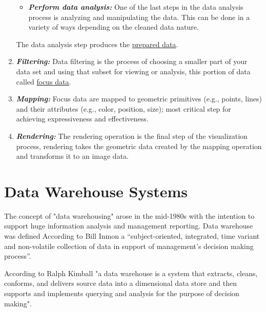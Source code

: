 \begin{enumerate}
\begin{itemize}
  \item \textbf{\textit{Perform data analysis:}}  One of the last steps in the data analysis process is analyzing and manipulating the data. This can be done in a variety of ways depending on the cleaned data nature\cite{WhatDataAnalysis}.
  \end{itemize}
  The data analysis step produces the \underline{prepared data}.
  \item \textbf{\textit{Filtering:}} Data filtering is the process of choosing a smaller part of your data set and using that subset for viewing or analysis\cite{WhatDataFiltering}, this portion of data called \underline{focus data}. 
  \item \textbf{\textit{Mapping:}} Focus data are mapped to geometric primitives (e.g., points, lines) and their attributes (e.g., color, position, size); most critical step for achieving expressiveness and effectiveness.
  \item \textbf{\textit{Rendering:}} The rendering operation is the final step of the visualization process, rendering takes the geometric data created by the mapping operation and transforms it to an image data.
  \end{enumerate}
  



\section{Data Warehouse Systems}
\label{sec:dataWarehouse}
The concept of "data warehousing" arose in the mid-1980s with the intention to support huge information analysis and management reporting\cite{wahDevelopmentDataWarehouse2009}. Data warehouse was defined According to Bill Inmon a “subject-oriented, integrated, time variant and non-volatile collection of data in support of management’s decision making process”\cite{inmonBuildingDataWarehouse2005}.
 
 
According to Ralph Kimball "a data warehouse is a system that extracts, cleans, conforms, and delivers source data into a dimensional data store and then supports and implements querying and analysis for the purpose of decision making"\cite{kimballDataWarehouseETLToolkit2011}.

